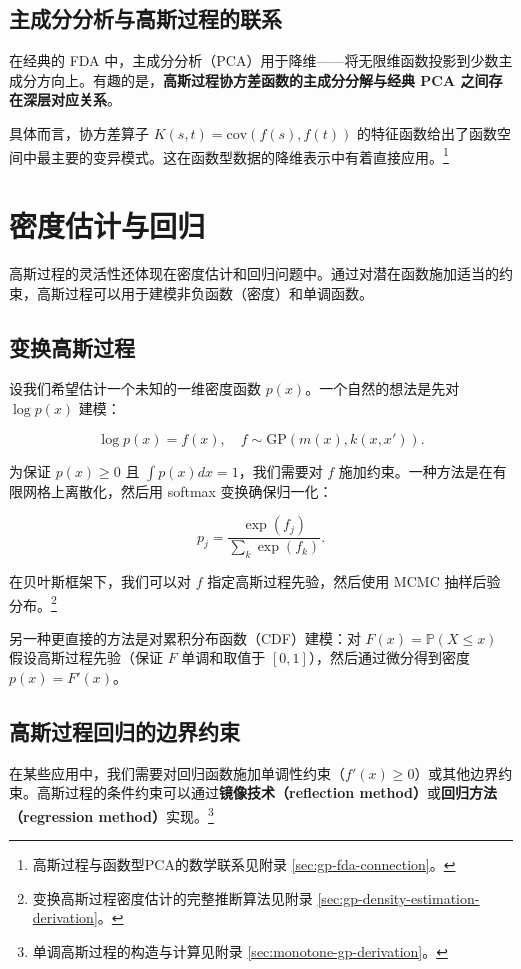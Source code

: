 \subsection{主成分分析与高斯过程的联系}

在经典的 FDA 中，主成分分析（PCA）用于降维——将无限维函数投影到少数主成分方向上。有趣的是，\textbf{高斯过程协方差函数的主成分分解与经典 PCA 之间存在深层对应关系}。

具体而言，协方差算子 $K(s, t) = \mathrm{cov}(f(s), f(t))$ 的特征函数给出了函数空间中最主要的变异模式。这在函数型数据的降维表示中有着直接应用。\footnote{高斯过程与函数型PCA的数学联系见附录 \cref{sec:gp-fda-connection}。}

\section{密度估计与回归}\label{sec:gp-density-estimation}

高斯过程的灵活性还体现在密度估计和回归问题中。通过对潜在函数施加适当的约束，高斯过程可以用于建模非负函数（密度）和单调函数。

\subsection{变换高斯过程}

设我们希望估计一个未知的一维密度函数 $p(x)$。一个自然的想法是先对 $\log p(x)$ 建模：

\[
\log p(x) = f(x), \quad f \sim \mathrm{GP}(m(x), k(x, x')).
\]

为保证 $p(x) \geq 0$ 且 $\int p(x) dx = 1$，我们需要对 $f$ 施加约束。一种方法是在有限网格上离散化，然后用 softmax 变换确保归一化：

\[
p_j = \frac{\exp(f_j)}{\sum_{k} \exp(f_k)}.
\]

在贝叶斯框架下，我们可以对 $f$ 指定高斯过程先验，然后使用 MCMC 抽样后验分布。\footnote{变换高斯过程密度估计的完整推断算法见附录 \cref{sec:gp-density-estimation-derivation}。}

另一种更直接的方法是对累积分布函数（CDF）建模：对 $F(x) = \mathbb{P}(X \leq x)$ 假设高斯过程先验（保证 $F$ 单调和取值于 $[0,1]$），然后通过微分得到密度 $p(x) = F'(x)$。

\subsection{高斯过程回归的边界约束}

在某些应用中，我们需要对回归函数施加单调性约束（$f'(x) \geq 0$）或其他边界约束。高斯过程的条件约束可以通过\textbf{镜像技术（reflection method）}或\textbf{回归方法（regression method）}实现。\footnote{单调高斯过程的构造与计算见附录 \cref{sec:monotone-gp-derivation}。}

